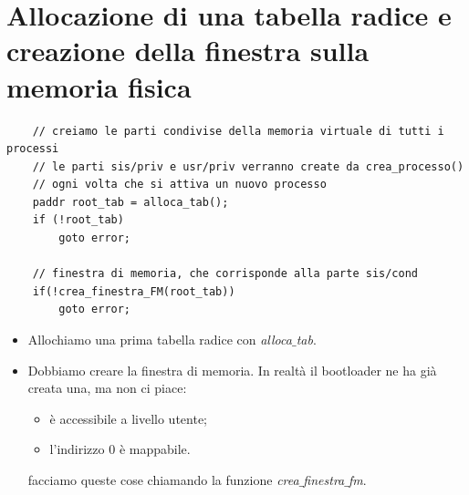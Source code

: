 \documentclass[11pt]{report}
\theoremstyle{definition}
\begin{document}
\section{Allocazione di una tabella radice e creazione della finestra sulla memoria fisica}	
	\small 
	\begin{verbatim}
	// creiamo le parti condivise della memoria virtuale di tutti i processi
	// le parti sis/priv e usr/priv verranno create da crea_processo()
	// ogni volta che si attiva un nuovo processo
	paddr root_tab = alloca_tab();
	if (!root_tab)
	    goto error;
	    
	// finestra di memoria, che corrisponde alla parte sis/cond
	if(!crea_finestra_FM(root_tab))
	    goto error;
	\end{verbatim}
	\normalsize 
	\begin{itemize}
		\item Allochiamo una prima tabella radice con \emph{alloca$\_$tab}.
		\item Dobbiamo creare la finestra di memoria. In realtà il bootloader ne ha già creata una, ma non ci piace:
		\begin{itemize}
			\item è accessibile a livello utente;
			\item l'indirizzo $0$ è mappabile.
		\end{itemize}
		facciamo queste cose chiamando la funzione \emph{crea$\_$finestra$\_$fm}.
	\end{itemize}
\end{document}
